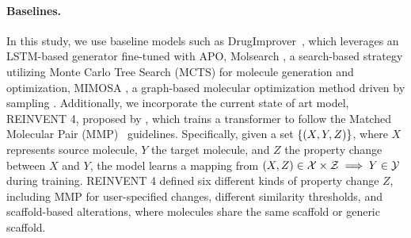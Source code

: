 \paragraph{Baselines.}
In this study, we use baseline models such as
DrugImprover~\citep{liu2023drugimprover}, which leverages an LSTM-based generator fine-tuned with APO, 
Molsearch \citep{sun2022molsearch}, a search-based strategy utilizing Monte Carlo Tree Search (MCTS) for molecule generation and optimization, MIMOSA \citep{fu2021mimosa}, a graph-based molecular optimization method driven by sampling . Additionally, we incorporate the current state of art model, REINVENT 4, proposed by \citet{ he2021molecular, he2022transformer,loeffler2024reinvent}, which trains a transformer to follow the Matched Molecular Pair (MMP)~\citep{kenny2005structure,tyrchan2017matched} guidelines.
Specifically, given a set $\left\{ \left( {X,Y,Z} \right) \right\}$, where $X$ represents source molecule,  $Y$ the target molecule, and $Z$ the property change between $X$ and $Y$, the model learns a mapping from $ \left( {X, Z} \right)  \in \mathcal{X} \times \mathcal{Z} \implies Y \in \mathcal{Y}$ during training. 
REINVENT 4 defined six different kinds of property change $Z$, {including MMP for user-specified changes, different similarity thresholds, and scaffold-based alterations, where molecules share the same scaffold or generic scaffold.} 




